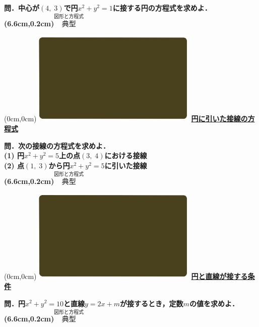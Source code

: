 \documentclass[10pt,
fleqn,
dvipdfmx,
uplatex
]{jsarticle}
\begin{document}
\huge 
\bf\boldmath 問．中心が$\left(4,\;3\right)$で円$x^2+y^2=1$に接する円の方程式を求めよ．
\at(6.6cm,0.2cm){\small\color{bradorange}$\overset{\text{図形と方程式}}{\text{典型}}$}


\newpage



\at(0cm,0cm){\includegraphics[width=8cm,bb=0 0 1920 1080]{./youtube/thumbnails/templates/smart_background/図形と方程式.jpeg}}
{\color{orange}\bf\boldmath\LARGE\underline{円に引いた接線の方程式}}\vspace{0.3zw}

\large 
\bf\boldmath 問．次の接線の方程式を求めよ．\\
(1)  円$x^2+y^2=5$上の点$\left(3,\;4\right)$における接線\\
(2)  点$\left(1,\;3\right)$から円$x^2+y^2=5$に引いた接線\\

\at(6.6cm,0.2cm){\small\color{bradorange}$\overset{\text{図形と方程式}}{\text{典型}}$}


\newpage



\at(0cm,0cm){\includegraphics[width=8cm,bb=0 0 1920 1080]{./youtube/thumbnails/templates/smart_background/図形と方程式.jpeg}}
{\color{orange}\bf\boldmath\LARGE\underline{円と直線が接する条件}}\vspace{0.3zw}

\LARGE 
\bf\boldmath 問．円$x^2+y^2={10}$と直線$y=2x+m$が接するとき，定数$m$の値を求めよ．
\at(6.6cm,0.2cm){\small\color{bradorange}$\overset{\text{図形と方程式}}{\text{典型}}$}


\newpage
\end{document}
